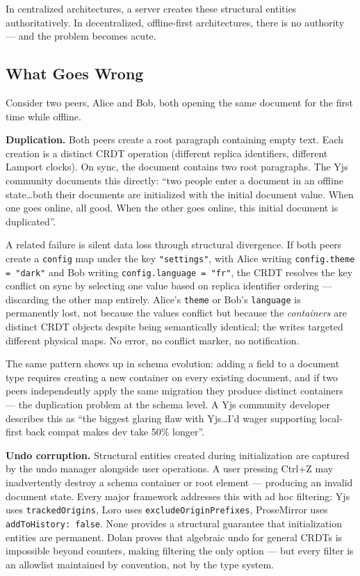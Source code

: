 In centralized architectures, a server creates these structural entities authoritatively. In decentralized, offline-first architectures, there is no authority --- and the problem becomes acute.

\subsection{What Goes Wrong}

Consider two peers, Alice and Bob, both opening the same document for the first time while offline.

\textbf{Duplication.} Both peers create a root paragraph containing empty text. Each creation is a distinct CRDT operation (different replica identifiers, different Lamport clocks). On sync, the document contains two root paragraphs. The Yjs community documents this directly: ``two people enter a document in an offline state\ldots both their documents are initialized with the initial document value. When one goes online, all good. When the other goes online, this initial document is duplicated''\cite{yjs:forum:offlineinit}.

A related failure is silent data loss through structural divergence. If both peers create a \texttt{config} map under the key \texttt{"settings"}, with Alice writing \texttt{config.theme = "dark"} and Bob writing \texttt{config.language = "fr"}, the CRDT resolves the key conflict on sync by selecting one value based on replica identifier ordering --- discarding the other map entirely. Alice's \texttt{theme} or Bob's \texttt{language} is permanently lost, not because the values conflict but because the \emph{containers} are distinct CRDT objects despite being semantically identical; the writes targeted different physical maps. No error, no conflict marker, no notification.

The same pattern shows up in schema evolution: adding a field to a document type requires creating a new container on every existing document, and if two peers independently apply the same migration they produce distinct containers --- the duplication problem at the schema level. A Yjs community developer describes this as ``the biggest glaring flaw with Yjs\ldots I'd wager supporting local-first back compat makes dev take 50\% longer''\cite{yjs:forum:migrations}.

\textbf{Undo corruption.} Structural entities created during initialization are captured by the undo manager alongside user operations. A user pressing Ctrl+Z may inadvertently destroy a schema container or root element --- producing an invalid document state. Every major framework addresses this with ad hoc filtering: Yjs uses \texttt{trackedOrigins}, Loro uses \texttt{excludeOriginPrefixes}, ProseMirror uses \texttt{addToHistory: false}. None provides a structural guarantee that initialization entities are permanent. Dolan\cite{dolan2020undoable} proves that algebraic undo for general CRDTs is impossible beyond counters, making filtering the only option --- but every filter is an allowlist maintained by convention, not by the type system.

